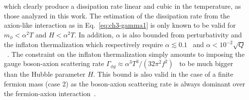 which clearly produce a dissipation rate linear and cubic in the temperature, as those analyzed in this work. The estimation of the dissipation rate from the axion-like interaction as in Eq.~\ref{eq:ch3-gamma1} is only known to be valid for $m_{\phi} < \alpha^2 T$ and $H < \alpha^2 T$. In addition, $\alpha$ is also bounded from perturbativity and the inflaton thermalization which respectively require $\alpha\lesssim 0.1$~\cite{Moore:2010jd} and $\alpha < 10^{-2}\sqrt{Q}$~\cite{Berghaus:2019whh}. The constraint on the inflaton thermalization simply amounts to imposing the gauge boson-axion scattering rate $\Gamma_{\phi g}\approx \alpha^3 T^3/(32\pi^2 f^2)$~\cite{Masso:2002np,Graf:2010tv} to be much bigger than the Hubble parameter $H$. This bound is also valid in the case of a finite fermion mass (case 2) as the boson-axion scattering rate is always dominant over the fermion-axion interaction~\cite{Berghaus:2020ekh}.


